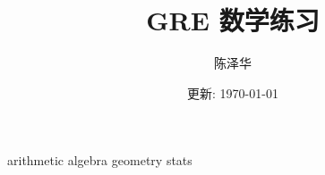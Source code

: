 \documentclass{report}
\title{GRE 数学练习}
\author{陈泽华}
\date{更新: \today}
\begin{document}
  \maketitle
  \tableofcontents

  {arithmetic}
  {algebra}
  {geometry}
  {stats}
\end{document}
